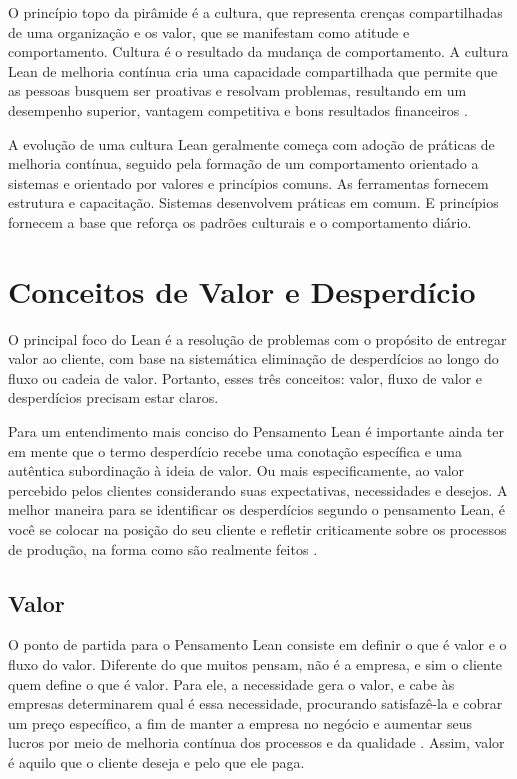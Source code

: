 \begin{anexosenv}
O princípio topo da pirâmide é a cultura, que representa crenças compartilhadas de uma organização e os valor, que se manifestam como atitude e comportamento. Cultura é o resultado da mudança de comportamento. A cultura Lean de melhoria contínua cria uma capacidade compartilhada que permite que as pessoas busquem ser proativas e resolvam problemas, resultando em um desempenho superior, vantagem competitiva e bons resultados financeiros \cite{bell2011}.

A evolução de uma cultura Lean geralmente começa com adoção de práticas de melhoria contínua, seguido pela formação de um comportamento orientado a sistemas e orientado por valores e princípios comuns. As ferramentas fornecem estrutura e capacitação. Sistemas desenvolvem práticas em comum. E princípios fornecem a base que reforça os padrões culturais e o comportamento diário.

\section[Conceitos de Valor e Desperdício]{Conceitos de Valor e Desperdício}

O principal foco do Lean é a resolução de problemas com o propósito de entregar valor ao cliente, com base na sistemática eliminação de desperdícios ao longo do fluxo ou cadeia de valor. Portanto, esses três conceitos: valor, fluxo de valor e desperdícios precisam estar claros.

Para um entendimento mais conciso do Pensamento Lean é importante ainda ter em mente que o termo desperdício recebe uma conotação específica e uma autêntica subordinação à ideia de valor. Ou mais especificamente, ao valor percebido pelos clientes considerando suas expectativas, necessidades e desejos. A melhor maneira para se identificar os desperdícios segundo o pensamento Lean, é você se colocar na posição do seu cliente e refletir criticamente sobre os processos de produção, na forma como são realmente feitos \cite{costa2010}.

\subsection[Valor]{Valor}

O ponto de partida para o Pensamento Lean consiste em definir o que é valor e o fluxo do valor. Diferente do que muitos pensam, não é a empresa, e sim o cliente quem define o que é valor. Para ele, a necessidade gera o valor, e cabe às empresas determinarem qual é essa necessidade, procurando satisfazê-la e cobrar um preço específico, a fim de manter a empresa no negócio e aumentar seus lucros por meio de melhoria contínua dos processos e da qualidade \cite{leaninstitute}. Assim, valor é aquilo que o cliente deseja e pelo que ele paga. 


\end{anexosenv}
